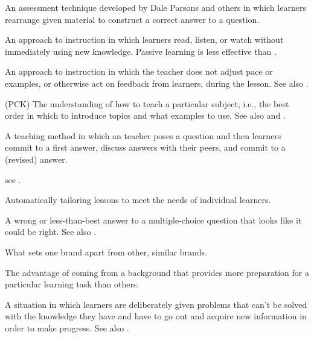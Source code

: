 \begin{description}
 An assessment technique developed by
Dale Parsons and others in which learners rearrange given material to construct
a correct answer to a question.

 An approach to instruction in which
learners read, listen, or watch without immediately using new knowledge.
Passive learning is less effective than .

 An approach to instruction in which
the teacher does not adjust pace or examples, or otherwise act on feedback from
learners, during the lesson.  See also .

 (PCK)
The understanding of how to teach a particular subject, i.e., the best order in
which to introduce topics and what examples to use. See also
and .

 A teaching method in which an
teacher poses a question and then learners commit to a first answer, discuss
answers with their peers, and commit to a (revised) answer.

 see .

 Automatically tailoring
lessons to meet the needs of individual learners.

 A wrong or less-than-best
answer to a multiple-choice question that looks like it could be right. See also
.

 What sets one brand apart from other,
similar brands.

 The advantage of coming
from a background that provides more preparation for a particular learning task
than others.

 A situation in which learners
are deliberately given problems that can't be solved with the knowledge they
have and have to go out and acquire new information in order to make progress.
See also .


\end{description}
